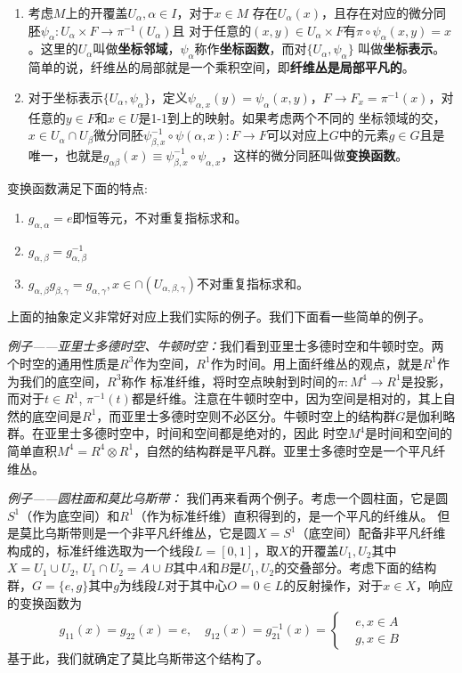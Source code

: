 \documentclass[supercite]{HustGraduPaper}
\begin{document}
\begin{appendices}
		\begin{enumerate}
			\item 考虑$M$上的开覆盖$U_\alpha,\alpha\in I$，对于$x \in M$ 存在$U_\alpha(x)$，且存在对应的微分同胚$\psi_\alpha: U_\alpha \times F \to \pi^{-1}(U_{\alpha})$且
			对于任意的$(x,y) \in U_{\alpha} \times F$有$\pi \circ \psi_\alpha(x,y) = x$。这里的$U_\alpha$叫做\textbf{坐标邻域}，$\psi_\alpha$称作\textbf{坐标函数}，而对$\{U_\alpha,\psi_\alpha\}$
			叫做\textbf{坐标表示}。简单的说，纤维丛的局部就是一个乘积空间，即\textbf{纤维丛是局部平凡的}。
			\item 对于坐标表示$\{U_\alpha,\psi_\alpha\}$，定义$\psi_{\alpha,x}(y) = \psi_{\alpha}(x,y)$，$F \to F_x = \pi^{-1}(x)$，对任意的$y \in F$和$x\in U$是1-1到上的映射。如果考虑两个不同的
			坐标领域的交，$x \in U_\alpha \cap U_{\beta}$微分同胚$\psi_{\beta,x}^{-1} \circ \psi(\alpha,x): F \to F$可以对应上$G$中的元素$g \in G$且是唯一，也就是$g_{\alpha \beta}(x) \equiv \psi_{\beta,x}^{-1} \circ \psi_{\alpha,x}$，这样的微分同胚叫做\textbf{变换函数}。
		\end{enumerate}
		变换函数满足下面的特点:
		\begin{enumerate}
			\item $g_{\alpha,\alpha} = e$即恒等元，不对重复指标求和。
			\item $g_{\alpha,\beta} = g^{-1}_{\alpha,\beta} $
			\item $g_{\alpha,\beta}g_{\beta,\gamma} = g_{\alpha,\gamma}, x \in \cap(U_{\alpha,\beta,\gamma})$不对重复指标求和。
		\end{enumerate}
		
		上面的抽象定义非常好对应上我们实际的例子。我们下面看一些简单的例子。
		
		\textit{例子——亚里士多德时空、牛顿时空：}我们看到亚里士多德时空和牛顿时空。两个时空的通用性质是$R^3$作为空间，$R^1$作为时间。用上面纤维丛的观点，就是$R^1$作为我们的底空间，$R^3$称作
		标准纤维，将时空点映射到时间的$\pi: M^4 \to R^1$是投影，而对于$t\in R^1$, $\pi^{-1}(t)$都是纤维。注意在牛顿时空中，因为空间是相对的，其上自然的底空间是$R^1$，而亚里士多德时空则不必区分。牛顿时空上的结构群$G$是伽利略群。在亚里士多德时空中，时间和空间都是绝对的，因此
		时空$M^4$是时间和空间的简单直积$M^4  = R^4 \otimes R^1$，自然的结构群是平凡群。亚里士多德时空是一个平凡纤维丛。
		
		
		\textit{例子——圆柱面和莫比乌斯带：} 我们再来看两个例子。考虑一个圆柱面，它是圆$S^1$（作为底空间）和$R^1$（作为标准纤维）直积得到的，是一个平凡的纤维从。 但是莫比乌斯带则是一个非平凡纤维丛，它是圆$X = S^1$（底空间）配备非平凡纤维构成的，标准纤维选取为一个线段$L = [0,1]$，取$X$的开覆盖$U_{1},U_{2}$其中$X = U_1 \cup U_2$, $U_1 \cap U_2 = A\cup B$其中$A$和$B$是$U_1,U_2$的交叠部分。考虑下面的结构群，$G = \{e,g\}$其中$g$为线段$L$对于其中心$O = 0 \in L$的反射操作，对于$x\in X$，响应的变换函数为
		\begin{equation}
		g_{11}(x) = g_{22}(x) = e, \quad g_12(x) = g_{21}^{-1}(x) = \begin{cases}
		&e, x\in A\\
		&g, x\in B
		\end{cases}
		\end{equation}
		基于此，我们就确定了莫比乌斯带这个结构了。
		

\end{appendices}
\end{document}
